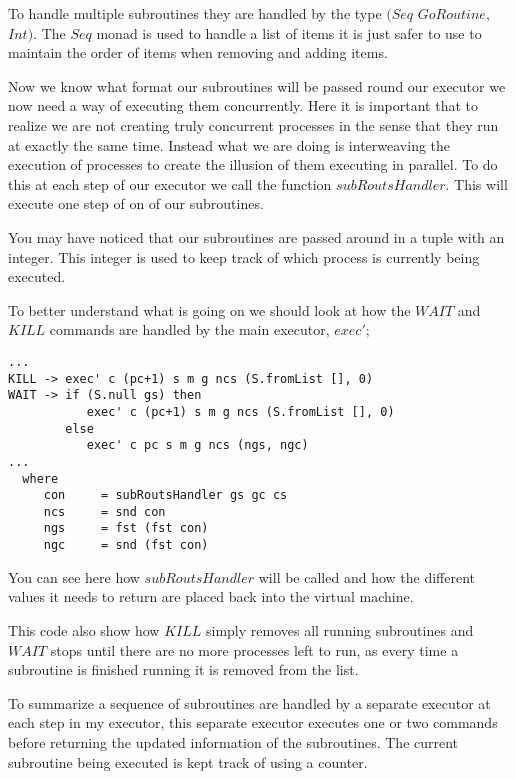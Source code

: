 To handle multiple subroutines they are handled by the type $(Seq$ $GoRoutine,$ $Int)$. The $Seq$ monad is used to handle a list of items it is just safer to use to maintain the order of items when removing and adding items. 

Now we know what format our subroutines will be passed round our executor we now need a way of executing them concurrently. Here it is important that to realize we are not creating truly concurrent processes in the sense that they run at exactly the same time. Instead what we are doing is interweaving the execution of processes to create the illusion of them executing in parallel. To do this at each step of our executor we call the function $subRoutsHandler$. This will execute one step of on of our subroutines. 

You may have noticed that our subroutines are passed around in a tuple with an integer. This integer is used to keep track of which process is currently being executed. 

To better understand what is going on we should look at how the $WAIT$ and $KILL$ commands are handled by the main executor, $exec'$;

\begin{lstlisting}
...
KILL -> exec' c (pc+1) s m g ncs (S.fromList [], 0)
WAIT -> if (S.null gs) then
           exec' c (pc+1) s m g ncs (S.fromList [], 0)      
        else 
           exec' c pc s m g ncs (ngs, ngc)   
...
  where
     con     = subRoutsHandler gs gc cs
     ncs     = snd con
     ngs     = fst (fst con)
     ngc     = snd (fst con)
\end{lstlisting}    
 

You can see here how $subRoutsHandler$ will be called and how the different values it needs to return are placed back into the virtual machine. 

This code also show how $KILL$ simply removes all running subroutines and $WAIT$ stops until there are no more processes left to run, as every time a subroutine is finished running it is removed from the list.

To summarize a sequence of subroutines are handled by a separate executor at each step in my executor, this separate executor executes one or two commands before returning the updated information of the subroutines. The current subroutine being executed is kept track of using a counter. 



